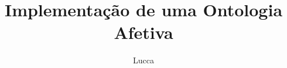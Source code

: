 \documentclass[ti]{iiufrgs}
\title{Implementação de uma Ontologia Afetiva}
\author{Lucca}{Ricardo Rodrigues}
\begin{document}
\maketitle

\tableofcontents


\listoffigures %



%




%


\singlespacing
\appendix


\end{document}
